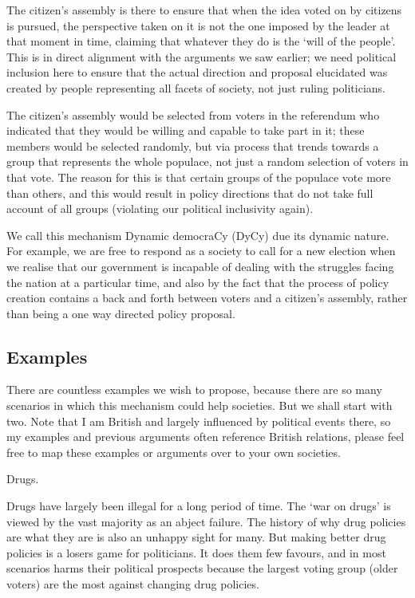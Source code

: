 \documentclass[twoside]{article}
\theoremstyle{definition}
\begin{document}
The citizen’s assembly is there to ensure that when the idea voted on by citizens is pursued, the perspective taken on it is not the one imposed by the leader at that moment in time, claiming that whatever they do is the ‘will of the people’. This is in direct alignment with the arguments we saw earlier; we need political inclusion here to ensure that the actual direction and proposal elucidated was created by people representing all facets of society, not just ruling politicians.

The citizen’s assembly would be selected from voters in the referendum who indicated that they would be willing and capable to take part in it; these members would be selected randomly, but via process that trends towards a group that represents the whole populace, not just a random selection of voters in that vote. The reason for this is that certain groups of the populace vote more than others, and this would result in policy directions that do not take full account of all groups (violating our political inclusivity again).

We call this mechanism Dynamic democraCy (DyCy) due its dynamic nature. For example, we are free to respond as a society to call for a new election when we realise that our government is incapable of dealing with the struggles facing the nation at a particular time, and also by the fact that the process of policy creation contains a back and forth between voters and a citizen’s assembly, rather than being a one way directed policy proposal.

\subsection{Examples}

There are countless examples we wish to propose, because there are so many scenarios in which this mechanism could help societies. But we shall start with two. Note that I am British and largely influenced by political events there, so my examples and previous arguments often reference British relations, please feel free to map these examples or arguments over to your own societies.

Drugs.

Drugs have largely been illegal for a long period of time. The ‘war on drugs’ is viewed by the vast majority as an abject failure. The history of why drug policies are what they are is also an unhappy sight for many. But making better drug policies is a losers game for politicians. It does them few favours, and in most scenarios harms their political prospects because the largest voting group (older voters) are the most against changing drug policies.
\end{document}
